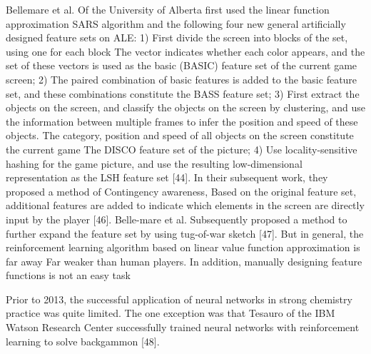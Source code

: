 \documentclass[11pt,en]{elegantpaper}
\begin{document}

Bellemare et al. Of the University of Alberta first used the linear function approximation SARS algorithm and the following four new general artificially designed feature sets on ALE: 1) First divide the screen into blocks of the set, using one for each block The vector indicates whether each color appears, and the set of these vectors is used as the basic (BASIC) feature set of the current game screen; 2) The paired combination of basic features is added to the basic feature set, and these combinations constitute the BASS feature set; 3) First extract the objects on the screen, and classify the objects on the screen by clustering, and use the information between multiple frames to infer the position and speed of these objects. The category, position and speed of all objects on the screen constitute the current game The DISCO feature set of the picture; 4) Use locality-sensitive hashing for the game picture, and use the resulting low-dimensional representation as the LSH feature set [44]. In their subsequent work, they proposed a method of Contingency awareness, Based on the original feature set, additional features are added to indicate which elements in the screen are directly input by the player [46]. Belle-mare et al. Subsequently proposed a method to further expand the feature set by using tug-of-war sketch [47]. But in general, the reinforcement learning algorithm based on linear value function approximation is far away Far weaker than human players. In addition, manually designing feature functions is not an easy task

Prior to 2013, the successful application of neural networks in strong chemistry practice was quite limited. The one exception was that Tesauro of the IBM Watson Research Center successfully trained neural networks with reinforcement learning to solve backgammon [48].
\end{document}
